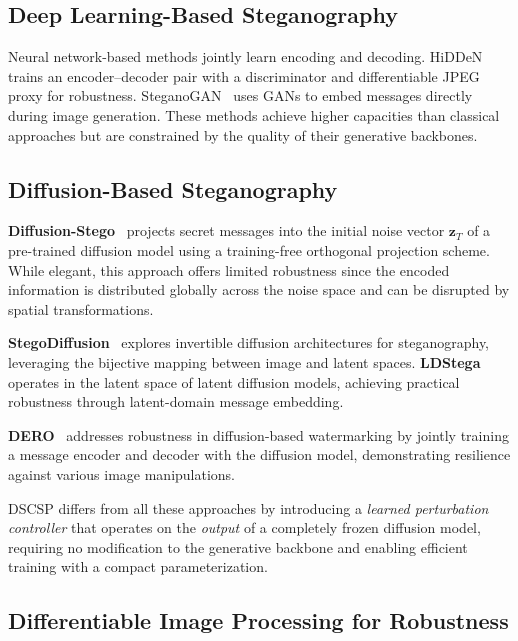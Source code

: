 \documentclass[10pt, twocolumn]{article}
\begin{document}
\subsection{Deep Learning-Based Steganography}

Neural network-based methods jointly learn encoding and decoding.
HiDDeN~\cite{zhu2018hidden} trains an encoder--decoder pair with a discriminator and differentiable JPEG proxy for robustness.
SteganoGAN~\cite{zhang2019steganogan} uses GANs to embed messages directly during image generation.
These methods achieve higher capacities than classical approaches but are constrained by the quality of their generative backbones.

\subsection{Diffusion-Based Steganography}

\textbf{Diffusion-Stego}~\cite{wei2023diffusionstego} projects secret messages into the initial noise vector $\mathbf{z}_T$ of a pre-trained diffusion model using a training-free orthogonal projection scheme.
While elegant, this approach offers limited robustness since the encoded information is distributed globally across the noise space and can be disrupted by spatial transformations.

\textbf{StegoDiffusion}~\cite{peng2023stegodiffusion} explores invertible diffusion architectures for steganography, leveraging the bijective mapping between image and latent spaces.
\textbf{LDStega}~\cite{zhang2024ldstega} operates in the latent space of latent diffusion models, achieving practical robustness through latent-domain message embedding.

\textbf{DERO}~\cite{zhao2024dero} addresses robustness in diffusion-based watermarking by jointly training a message encoder and decoder with the diffusion model, demonstrating resilience against various image manipulations.

DSCSP differs from all these approaches by introducing a \emph{learned perturbation controller} that operates on the \emph{output} of a completely frozen diffusion model, requiring no modification to the generative backbone and enabling efficient training with a compact parameterization.

\subsection{Differentiable Image Processing for Robustness}
\end{document}
